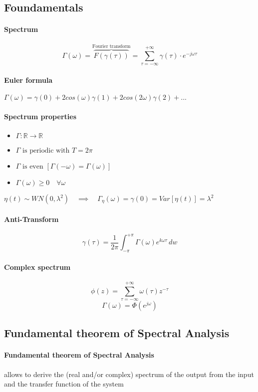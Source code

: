 \documentclass{article}
\newcommand{\R}{\mathbb{R}}
\begin{document}
\subsection{Foundamentals}
\paragraph{Spectrum} \[
\Gamma(\omega)=\overbrace{F(\gamma(\tau))}^\text{Fourier transform}=\sum_{\tau=-\infty}^{+\infty}\gamma(\tau)\cdot e^{-j\omega\tau}
\]
\paragraph{Euler formula} $\Gamma(\omega)=\gamma(0)+2cos(\omega)\gamma(1)+2cos(2\omega)\gamma(2)+...$
\paragraph{Spectrum properties} 
\begin{itemize}
	\item $\Gamma: \R \to \R$
	\item $\Gamma\text{ is periodic with }T=2\pi$
	\item $\Gamma\text{ is even }[\Gamma(-\omega)=\Gamma(\omega)]$
	\item $\Gamma(\omega)\geq 0 \quad \forall\omega$
\end{itemize}
$\eta(t) \sim WN(0,\lambda^2) \quad\implies\quad \Gamma_\eta(\omega)=\gamma(0)=Var[\eta(t)]=\lambda^2$
\paragraph{Anti-Transform}
\[
\gamma(\tau)=\frac{1}{2\pi}\int_{-\pi}^{+\pi} \Gamma(\omega)e^{k\omega\tau}\,dw
\]
\paragraph{Complex spectrum}
\[
\phi(z)=\sum_{\tau =-\infty}^{+\infty} \omega(\tau)z^{-\tau}
\]
\[
\Gamma(\omega)=\Phi(e^{j\omega})
\]

\subsection{Fundamental theorem of Spectral Analysis} 

\paragraph{Fundamental theorem of Spectral Analysis} allows to derive the (real and/or complex) spectrum of the output from  the input and the transfer function of the system
\end{document}
